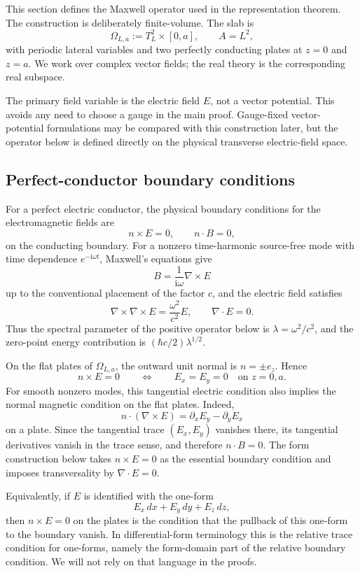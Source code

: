 \documentclass[11pt]{article}
\providecommand{\ii}{\mathrm{i}}
\providecommand{\hbarc}{\hbar c}
\providecommand{\OmegaLa}{\Omega_{L,a}}
\providecommand{\TtwoL}{T_L^2}
\providecommand{\Aarea}{A}
\numberwithin{equation}{section}
\begin{document}
This section defines the Maxwell operator used in the representation theorem.  The construction is deliberately finite-volume.  The slab is
\[
    \OmegaLa:=\TtwoL\times[0,a],
    \qquad
    \Aarea=L^2,
\]
with periodic lateral variables and two perfectly conducting plates at
\(z=0\) and \(z=a\).  We work over complex vector fields; the real theory is the corresponding real subspace.

The primary field variable is the electric field \(E\), not a vector potential.  This avoids any need to choose a gauge in the main proof.  Gauge-fixed vector-potential formulations may be compared with this construction later, but the operator below is defined directly on the physical transverse electric-field space.

\subsection{Perfect-conductor boundary conditions}
\label{subsec:pec-boundary}

For a perfect electric conductor, the physical boundary conditions for the electromagnetic fields are
\[
    n\times E=0,
    \qquad
    n\cdot B=0,
\]
on the conducting boundary.  For a nonzero time-harmonic source-free mode with time dependence \(e^{-\ii\omega t}\), Maxwell's equations give
\[
    B=\frac{1}{\ii\omega}\nabla\times E
\]
up to the conventional placement of the factor \(c\), and the electric field satisfies
\[
    \nabla\times\nabla\times E=\frac{\omega^2}{c^2}E,
    \qquad
    \nabla\cdot E=0 .
\]
Thus the spectral parameter of the positive operator below is \(\lambda=\omega^2/c^2\), and the zero-point energy contribution is \((\hbarc/2)\lambda^{1/2}\).

On the flat plates of \(\OmegaLa\), the outward unit normal is \(n=\pm e_z\).  Hence
\[
    n\times E=0
    \qquad\Longleftrightarrow\qquad
    E_x=E_y=0
    \quad\text{on }z=0,a .
\]
For smooth nonzero modes, this tangential electric condition also implies the normal magnetic condition on the flat plates.  Indeed,
\[
    n\cdot(\nabla\times E)=\partial_xE_y-\partial_yE_x
\]
on a plate.  Since the tangential trace \((E_x,E_y)\) vanishes there, its tangential derivatives vanish in the trace sense, and therefore \(n\cdot B=0\).  The form construction below takes \(n\times E=0\) as the essential boundary condition and imposes transversality by \(\nabla\cdot E=0\).

Equivalently, if \(E\) is identified with the one-form
\[
    E_x\,dx+E_y\,dy+E_z\,dz,
\]
then \(n\times E=0\) on the plates is the condition that the pullback of this
one-form to the boundary vanish.  In differential-form terminology this is the
relative trace condition for one-forms, namely the form-domain part of the
relative boundary condition.  We will not rely on that language in the proofs.
\end{document}
